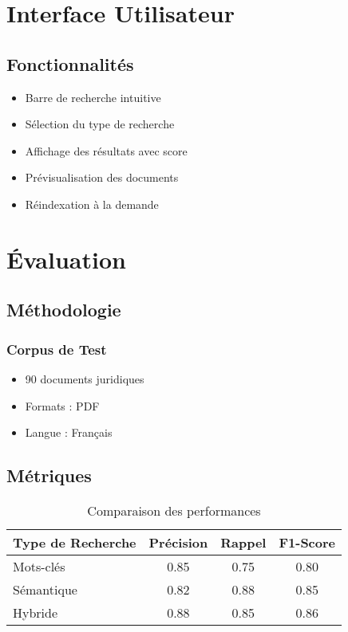 \documentclass[12pt,a4paper]{article}
\begin{document}
\section{Interface Utilisateur}

\subsection{Fonctionnalités}
\begin{itemize}
    \item Barre de recherche intuitive
    \item Sélection du type de recherche
    \item Affichage des résultats avec score
    \item Prévisualisation des documents
    \item Réindexation à la demande
\end{itemize}

\section{Évaluation}

\subsection{Méthodologie}
\subsubsection{Corpus de Test}
\begin{itemize}
    \item 90 documents juridiques
    \item Formats : PDF
    \item Langue : Français
\end{itemize}

\subsection{Métriques}
\begin{table}[H]
\centering
\begin{tabular}{lccc}
\toprule
\textbf{Type de Recherche} & \textbf{Précision} & \textbf{Rappel} & \textbf{F1-Score} \\
\midrule
Mots-clés & 0.85 & 0.75 & 0.80 \\
Sémantique & 0.82 & 0.88 & 0.85 \\
Hybride & 0.88 & 0.85 & 0.86 \\
\bottomrule
\end{tabular}
\caption{Comparaison des performances}
\end{table}
\end{document}
